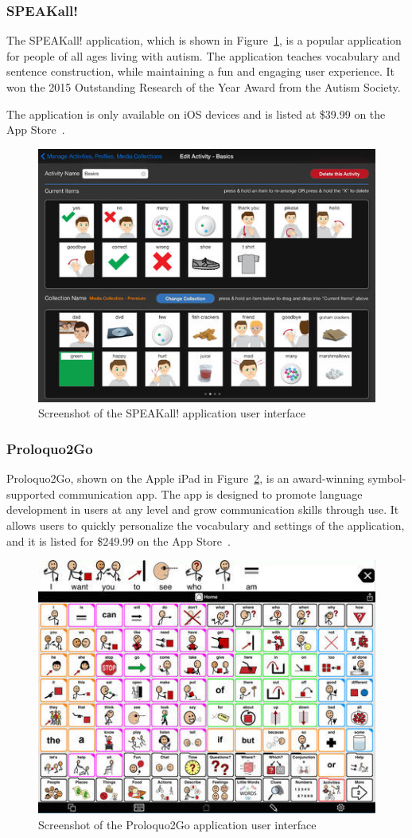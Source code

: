 \subsubsection{SPEAKall!}
The SPEAKall! application, which is shown in Figure~\ref{fig:speakAll}, is a popular application for people of all ages living with autism. The application teaches vocabulary and sentence construction, while maintaining a fun and engaging user experience. It won the 2015 Outstanding Research of the Year Award from the Autism Society.

The application is only available on iOS devices and is listed at \$39.99 on the App Store~\cite{speakAll}. 

\begin{figure}[!htb]
\centering
\includegraphics[width=.7\textwidth]{speakAll.png}
\caption{\label{fig:speakAll}Screenshot of the SPEAKall! application user interface}
\end{figure}

\subsubsection{Proloquo2Go}
Proloquo2Go, shown on the Apple iPad in Figure~\ref{fig:proloquo2go}, is an award-winning symbol-supported communication app. The app is designed to promote language development in users at any level and grow communication skills through use. It allows users to quickly personalize the vocabulary and settings of the application, and it is listed for \$249.99 on the App Store~\cite{proloquo}. 

\begin{figure}[!htb]
\centering
\includegraphics[width=.6\textwidth]{proloquo2go.png}
\caption{\label{fig:proloquo2go}Screenshot of the Proloquo2Go application user interface}
\end{figure}